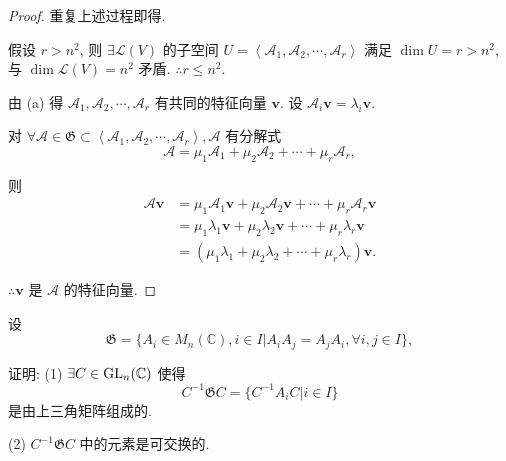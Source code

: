 \documentclass[color=black,device=normal,lang=cn,mode=geye]{elegantnote}
\begin{document}
\begin{proof}
    重复上述过程即得.
    
    假设 $r>n^2$, 则 $\exists\mathcal{L}(V)$ 的子空间 $U=\left<\mathcal{A}_1,\mathcal{A}_2,\cdots,\mathcal{A}_r\right>$ 满足 $\dim U=r>n^2$, 与 $\dim\mathcal{L}(V)=n^2$ 矛盾. $\therefore r\leq n^2$.

    由 (a) 得 $\mathcal{A}_1,\mathcal{A}_2,\cdots,\mathcal{A}_r$ 有共同的特征向量 $\boldsymbol{v}$. 设 $\mathcal{A}_i\boldsymbol{v}=\lambda_i\boldsymbol{v}$.

    对 $\forall\mathcal{A}\in\mathfrak{G}\subset\left<\mathcal{A}_1,\mathcal{A}_2,\cdots,\mathcal{A}_r\right>,\mathcal{A}$ 有分解式
    \[\mathcal{A}=\mu_1\mathcal{A}_1+\mu_2\mathcal{A}_2+\cdots+\mu_r\mathcal{A}_r,\]

    则
    \begin{align*}
        \mathcal{A}\boldsymbol{v} & =\mu_1\mathcal{A}_1\boldsymbol{v}+\mu_2\mathcal{A}_2\boldsymbol{v}+\cdots+\mu_r\mathcal{A}_r\boldsymbol{v} \\
        & =\mu_1\lambda_1\boldsymbol{v}+\mu_2\lambda_2\boldsymbol{v}+\cdots+\mu_r\lambda_r\boldsymbol{v} \\
        & =(\mu_1\lambda_1+\mu_2\lambda_2+\cdots+\mu_r\lambda_r)\boldsymbol{v}.
    \end{align*}

    $\therefore\boldsymbol{v}$ 是 $\mathcal{A}$ 的特征向量.
\end{proof}
\begin{exercise}%
    设
    \[\mathfrak{G}=\{A_i\in M_n(\mathbb{C}),i\in I|A_iA_j=A_jA_i,\forall i,j\in I\},\]

    证明: (1) $\exists C\in\operatorname{GL} _n(\mathbb{C})$ 使得
    \[C^{-1}\mathfrak{G}C=\{C^{-1}A_iC|i\in I\}\]
    是由上三角矩阵组成的.

    (2) $C^{-1}\mathfrak{G}C$ 中的元素是可交换的.
\end{exercise}
\end{document}
